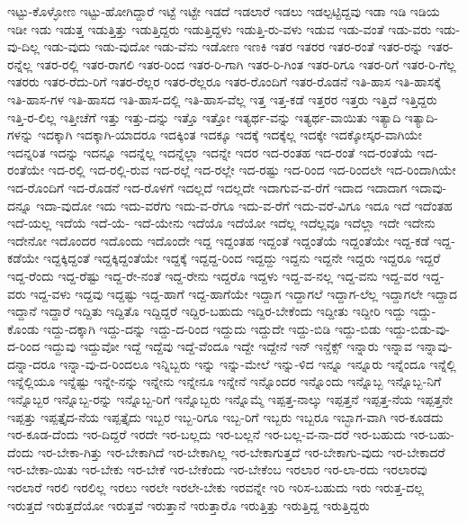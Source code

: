 {ಇಟ್ಟು-ಕೊಳ್ಳೋಣ
ಇಟ್ಟು-ಹೋಗಿದ್ದಾರೆ
ಇಟ್ಟೆ
ಇಟ್ಟೇ
ಇಡದೆ
ಇಡಲಾರೆ
ಇಡಲು
ಇಡಲ್ಪಟ್ಟಿದ್ದವು
ಇಡಾ
ಇಡಿ
ಇಡಿಯ
ಇಡೀ
ಇಡು
ಇಡುತ್ತ
ಇಡುತ್ತಿತ್ತು
ಇಡುತ್ತಿದ್ದರು
ಇಡುತ್ತಿದ್ದಳು
ಇಡುತ್ತಿ-ರು-ವಳು
ಇಡುವ
ಇಡು-ವಂತೆ
ಇಡು-ವರು
ಇಡು-ವು-ದಿಲ್ಲ
ಇಡು-ವುದು
ಇಡು-ವುದೋ
ಇಡು-ವೆನು
ಇಡೋಣ
ಇಣಕಿ
ಇತರ
ಇತರರ
ಇತರ-ರಂತೆ
ಇತರ-ರನ್ನು
ಇತರ-ರನ್ನೆಲ್ಲ
ಇತರ-ರಲ್ಲಿ
ಇತರ-ರಾಗಲಿ
ಇತರ-ರಿಂದ
ಇತರ-ರಿ-ಗಾಗಿ
ಇತರ-ರಿ-ಗಿಂತ
ಇತರ-ರಿಗೂ
ಇತರ-ರಿಗೆ
ಇತರ-ರಿ-ಗೆಲ್ಲ
ಇತರರು
ಇತರ-ರೆದು-ರಿಗೆ
ಇತರ-ರೆಲ್ಲರ
ಇತರ-ರೆಲ್ಲರೂ
ಇತರ-ರೊಂದಿಗೆ
ಇತರ-ರೊಡನೆ
ಇತಿ-ಹಾಸ
ಇತಿ-ಹಾಸಕ್ಕೆ
ಇತಿ-ಹಾಸ-ಗಳ
ಇತಿ-ಹಾಸದ
ಇತಿ-ಹಾಸ-ದಲ್ಲಿ
ಇತಿ-ಹಾಸ-ವೆಲ್ಲ
ಇತ್ತ
ಇತ್ತ-ಕಡೆ
ಇತ್ತರರ
ಇತ್ತರು
ಇತ್ತಿದೆ
ಇತ್ತಿದ್ದರು
ಇತ್ತಿ-ರ-ಲಿಲ್ಲ
ಇತ್ತೀಚೆಗೆ
ಇತ್ತು
ಇತ್ತು-ದನ್ನು
ಇತ್ತೊ
ಇತ್ತೋ
ಇತ್ಯರ್ಥ-ವನ್ನು
ಇತ್ಯರ್ಥ-ವಾಯಿತು
ಇತ್ಯಾದಿ
ಇತ್ಯಾದಿ-ಗಳನ್ನು
ಇದಕ್ಕಾಗಿ
ಇದಕ್ಕಾಗಿ-ಯಾದರೂ
ಇದಕ್ಕಿಂತ
ಇದಕ್ಕೂ
ಇದಕ್ಕೆ
ಇದಕ್ಕೆಲ್ಲ
ಇದಕ್ಕೇ
ಇದಕ್ಕೋಸ್ಕರ-ವಾಗಿಯೇ
ಇದನ್ನರಿತ
ಇದನ್ನು
ಇದನ್ನೂ
ಇದನ್ನೆಲ್ಲ
ಇದನ್ನೆಲ್ಲಾ
ಇದನ್ನೇ
ಇದರ
ಇದ-ರಂತಹ
ಇದ-ರಂತೆ
ಇದ-ರಂತೆಯೆ
ಇದ-ರಂತೆಯೇ
ಇದ-ರಲ್ಲಿ
ಇದ-ರಲ್ಲಿ-ರುವ
ಇದ-ರಲ್ಲೆ
ಇದ-ರಲ್ಲೇ
ಇದ-ರಷ್ಟು
ಇದ-ರಿಂದ
ಇದ-ರಿಂದಲೇ
ಇದ-ರಿಂದಾಗಿಯೇ
ಇದ-ರೊಂದಿಗೆ
ಇದ-ರೊಡನೆ
ಇದ-ರೊಳಗೆ
ಇದಲ್ಲದೆ
ಇದಲ್ಲದೇ
ಇದಾಗುವ-ವ-ರೆಗೆ
ಇದಾದ
ಇದಾದಾಗ
ಇದಾವು-ದನ್ನೂ
ಇದಾ-ವುದೋ
ಇದು
ಇದು-ವರೆಗು
ಇದು-ವ-ರೆಗೂ
ಇದು-ವ-ರೆಗೆ
ಇದು-ವರೆ-ವಿಗೂ
ಇದೂ
ಇದೆ
ಇದೆಂತಹ
ಇದೆ-ಯಲ್ಲ
ಇದೆಯೆ
ಇದೆ-ಯೆ-
ಇದೆ-ಯೇನು
ಇದೆಯೊ
ಇದೆಯೋ
ಇದೆಲ್ಲ
ಇದೆಲ್ಲವೂ
ಇದೆಲ್ಲಾ
ಇದೇ
ಇದೇನು
ಇದೇನೋ
ಇದೊಂದರ
ಇದೊಂದು
ಇದೊಂದೇ
ಇದ್ದ
ಇದ್ದಂತಹ
ಇದ್ದಂತೆ
ಇದ್ದಂತೆಯೆ
ಇದ್ದಂತೆಯೇ
ಇದ್ದ-ಕಡೆ
ಇದ್ದ-ಕಡೆಯೇ
ಇದ್ದಕ್ಕಿದ್ದಂತೆ
ಇದ್ದಕ್ಕಿದ್ದಂತೆಯೇ
ಇದ್ದಕ್ಕೆ
ಇದ್ದದ್ದ-ರಿಂದ
ಇದ್ದದ್ದು
ಇದ್ದನು
ಇದ್ದನೇ
ಇದ್ದರು
ಇದ್ದರೂ
ಇದ್ದರೆ
ಇದ್ದ-ರೆಂದು
ಇದ್ದ-ರೆಷ್ಟು
ಇದ್ದ-ರೇ-ನಂತೆ
ಇದ್ದ-ರೇನು
ಇದ್ದರೊ
ಇದ್ದಳು
ಇದ್ದ-ವ-ನಲ್ಲ
ಇದ್ದ-ವನು
ಇದ್ದ-ವರ
ಇದ್ದ-ವರು
ಇದ್ದ-ವಳು
ಇದ್ದವು
ಇದ್ದಷ್ಟು
ಇದ್ದ-ಹಾಗೆ
ಇದ್ದ-ಹಾಗೆಯೇ
ಇದ್ದಾಗ
ಇದ್ದಾಗಲೆ
ಇದ್ದಾಗ-ಲೆಲ್ಲ
ಇದ್ದಾಗಲೇ
ಇದ್ದಾದ
ಇದ್ದಾನೆ
ಇದ್ದಾರೆ
ಇದ್ದಿತು
ಇದ್ದಿತೊ
ಇದ್ದಿದ್ದರೆ
ಇದ್ದಿರ-ಬಹುದು
ಇದ್ದಿರ-ಬೇಕೆಂದು
ಇದ್ದೀತು
ಇದ್ದೀರಿ
ಇದ್ದು
ಇದ್ದು-ಕೊಂಡು
ಇದ್ದು-ದಕ್ಕಾಗಿ
ಇದ್ದು-ದನ್ನು
ಇದ್ದು-ದ-ರಿಂದ
ಇದ್ದುದು
ಇದ್ದುದೇ
ಇದ್ದು-ಬಿಡಿ
ಇದ್ದು-ಬಿಡು
ಇದ್ದು-ಬಿಡು-ವು-ದ-ರಿಂದ
ಇದ್ದುವು
ಇದ್ದುವೋ
ಇದ್ದೆ
ಇದ್ದೆವು
ಇದ್ದೆ-ವೆಂದೂ
ಇದ್ದೇ
ಇದ್ದೇನೆ
ಇನ್
ಇನ್ಡೆಕ್ಸ್
ಇನ್ನಾರು
ಇನ್ನಾವ
ಇನ್ನಾವು-ದನ್ನಾ-ದರೂ
ಇನ್ನಾ-ವು-ದ-ರಿಂದಲೂ
ಇನ್ನಿಬ್ಬರು
ಇನ್ನು
ಇನ್ನು-ಮೇಲೆ
ಇನ್ನು-ಳಿದ
ಇನ್ನೂ
ಇನ್ನೂರು
ಇನ್ನೆಂದೂ
ಇನ್ನೆಲ್ಲಿ
ಇನ್ನೆಲ್ಲಿಯೂ
ಇನ್ನೆಷ್ಟು
ಇನ್ನೇ-ನನ್ನು
ಇನ್ನೇನು
ಇನ್ನೇನೂ
ಇನ್ನೇನೆ
ಇನ್ನೊಂದರ
ಇನ್ನೊಂದು
ಇನ್ನೊಬ್ಬ
ಇನ್ನೊಬ್ಬ-ನಿಗೆ
ಇನ್ನೊಬ್ಬರ
ಇನ್ನೊಬ್ಬ-ರನ್ನು
ಇನ್ನೊಬ್ಬ-ರಿಗೆ
ಇನ್ನೊಬ್ಬರು
ಇನ್ನೊಮ್ಮೆ
ಇಪ್ಪತ್ತ-ನಾಲ್ಕು
ಇಪ್ಪತ್ತನೆ
ಇಪ್ಪತ್ತ-ನೆಯ
ಇಪ್ಪತ್ತನೇ
ಇಪ್ಪತ್ತು
ಇಪ್ಪತ್ತೈದ-ನೆಯ
ಇಪ್ಪತ್ತೈದು
ಇಬ್ಬರ
ಇಬ್ಬ-ರಿಗೂ
ಇಬ್ಬ-ರಿಗೆ
ಇಬ್ಬರು
ಇಬ್ಬರೂ
ಇಬ್ಭಾಗ-ವಾಗಿ
ಇರ-ಕೂಡದು
ಇರ-ಕೂಡ-ದೆಂದು
ಇರ-ದಿದ್ದರೆ
ಇರದೇ
ಇರ-ಬಲ್ಲದು
ಇರ-ಬಲ್ಲನೆ
ಇರ-ಬಲ್ಲ-ವ-ನಾ-ದರೆ
ಇರ-ಬಹುದು
ಇರ-ಬಹು-ದೆಂದು
ಇರ-ಬೇಕಾ-ಗಿತ್ತು
ಇರ-ಬೇಕಾಗಿದೆ
ಇರ-ಬೇಕಾಗಿಲ್ಲ
ಇರ-ಬೇಕಾಗುತ್ತದೆ
ಇರ-ಬೇಕಾಗು-ವುದು
ಇರ-ಬೇಕಾದರೆ
ಇರ-ಬೇಕಾ-ಯಿತು
ಇರ-ಬೇಕು
ಇರ-ಬೇಕೆ
ಇರ-ಬೇಕೆಂದು
ಇರ-ಬೇಕೆಂಬ
ಇರಲಾರ
ಇರ-ಲಾ-ರದು
ಇರಲಾರವು
ಇರಲಾರೆ
ಇರಲಿ
ಇರಲಿಲ್ಲ
ಇರಲು
ಇರಲೇ
ಇರಲೇ-ಬೇಕು
ಇರವನ್ನೇ
ಇರಿ
ಇರಿಸ-ಬಹುದು
ಇರು
ಇರುತ್ತ-ದಲ್ಲ
ಇರುತ್ತದೆ
ಇರುತ್ತದೆಯೋ
ಇರುತ್ತವೆ
ಇರುತ್ತಾನೆ
ಇರುತ್ತಾರೊ
ಇರುತ್ತಿತ್ತು
ಇರುತ್ತಿದ್ದ
ಇರುತ್ತಿದ್ದರು
}
